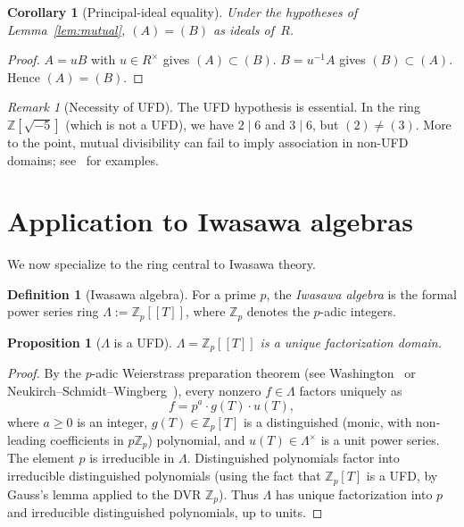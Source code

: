 \documentclass[11pt]{amsart}
\newtheorem{proposition}[theorem]{Proposition}
\newtheorem{corollary}[theorem]{Corollary}
\theoremstyle{definition}
\newtheorem{definition}[theorem]{Definition}
\theoremstyle{remark}
\newtheorem{remark}[theorem]{Remark}
\newcommand{\Z}{\mathbb{Z}}
\newcommand{\Zp}{\mathbb{Z}_p}
\newcommand{\Lam}{\Lambda}
\begin{document}
\begin{corollary}[Principal-ideal equality]\label{cor:ideal}
Under the hypotheses of Lemma~\ref{lem:mutual},
$(A)=(B)$ as ideals of~$R$.
\end{corollary}
\begin{proof}
$A=uB$ with $u\in R^\times$ gives $(A)\subset(B)$.
$B=u^{-1}A$ gives $(B)\subset(A)$.
Hence $(A)=(B)$.
\end{proof}

\begin{remark}[Necessity of UFD]
The UFD hypothesis is essential.  In the ring $\Z[\sqrt{-5}]$
(which is not a UFD), we have $2\mid 6$ and $3\mid 6$, but $(2)\neq(3)$.
More to the point, mutual divisibility can fail to imply association
in non-UFD domains; see~\cite[Chapter~1]{Samuel} for examples.
\end{remark}

\section{Application to Iwasawa algebras}\label{sec:iwasawa}

We now specialize to the ring central to Iwasawa theory.

\begin{definition}[Iwasawa algebra]
For a prime $p$, the \emph{Iwasawa algebra} is the formal power series
ring $\Lam:=\Zp[\![T]\!]$, where $\Zp$ denotes the $p$-adic integers.
\end{definition}

\begin{proposition}[$\Lam$ is a UFD]\label{prop:lambda-ufd}
$\Lam=\Zp[\![T]\!]$ is a unique factorization domain.
\end{proposition}
\begin{proof}
By the $p$-adic Weierstrass preparation theorem
(see Washington~\cite[\S 7.1]{Washington} or
Neukirch--Schmidt--Wingberg~\cite[\S V.1]{NSW}),
every nonzero $f\in\Lam$ factors uniquely as
\[
f=p^a\cdot g(T)\cdot u(T),
\]
where $a\ge 0$ is an integer, $g(T)\in\Zp[T]$ is a distinguished
(monic, with non-leading coefficients in $p\Zp$) polynomial, and
$u(T)\in\Lam^\times$ is a unit power series.
The element $p$ is irreducible in $\Lam$.
Distinguished polynomials factor into irreducible distinguished
polynomials (using the fact that $\Zp[T]$ is a UFD, by Gauss's lemma
applied to the DVR $\Zp$).
Thus $\Lam$ has unique factorization into $p$ and irreducible
distinguished polynomials, up to units.
\end{proof}
\end{document}
